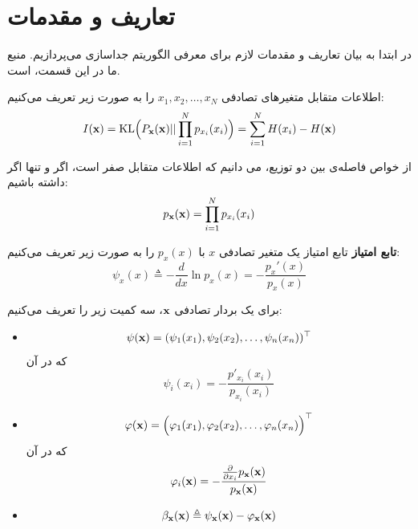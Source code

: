\documentclass[oneside]{thesis}
\begin{document}
\section{تعاریف و مقدمات}

در ابتدا به بیان تعاریف و مقدمات لازم برای معرفی الگوریتم جداسازی می‌پردازیم. منبع ما در این قسمت، 
\cite{mbzadehthesis}
است.
\begin{definition}
	اطلاعات متقابل متغیر‌های تصادفی
	$x_1, x_2, \dots, x_N$
	را به صورت زیر تعریف می‌کنیم:
	\begin{equation}
	I(\mathbf{x}) = \mathrm{KL}\Big(P_{\mathbf{x}}(\mathbf{x}) || \prod_{i = 1}^{N} p_{x_i}(x_i)\Big) = \sum_{i = 1}^{N} H(x_i) - H(\mathbf{x})
	\end{equation}
\end{definition}

از خواص فاصله‌ی 
بین دو توزیع، می دانیم که اطلاعات متقابل صفر است، اگر و تنها اگر داشته باشیم:
\begin{equation}
p_{\mathbf{x}}(\mathbf{x}) = \prod_{i = 1}^{N} p_{x_i}(x_i)
\end{equation}

\begin{definition}
	\textbf{تابع امتیاز}
	تابع امتیاز یک متغیر تصادفی 
	$x$
	با 
	$p_x(x)$
	را به صورت زیر تعریف می‌کنیم:
	\begin{equation}
	\psi_x(x) \triangleq -\frac{d}{dx} \ln p_x(x) = -\frac{p_x'(x)}{p_x(x)}
	\end{equation}
\end{definition}


\begin{definition}
	برای یک بردار تصادفی 
	$\mathbf{x}$، 
	سه کمیت زیر را تعریف می‌کنیم:
\end{definition}
	\begin{itemize}
		\item
		\textbf{}
		\begin{equation}
		\mathbf{\psi}(\mathbf{x}) = (\psi_1(x_1), \psi_2(x_2),\dots, \psi_n(x_n))^\top
		\end{equation}
		که در آن
		\begin{equation}
		\psi_i(x_i) = - \frac{p'_{x_i}(x_i)}{p_{x_i}(x_i)}
		\end{equation}
		\item 
		\textbf{}
		\begin{equation}
		\mathbf{\varphi}(\mathbf{x}) = \Big(\varphi_1(x_1), \varphi_2(x_2),\dots, \varphi_n(x_n)\Big)^\top
		\end{equation}
		که در آن
		\begin{equation}
		\varphi_i(\mathbf{x}) = -\frac{\frac{\partial}{\partial x_i}p_{\mathbf{x}}(\mathbf{x})}{p_{\mathbf{x}}(\mathbf{x})}
		\end{equation}
		
		\item
		\textbf{ }	
		\begin{equation}
		\mathbf{\beta}_{\mathbf{x}} (\mathbf{x}) \triangleq \mathbf{\psi}_{\mathbf{x}}(\mathbf{x}) - \varphi_{\mathbf{x}}(\mathbf{x})
		\end{equation}
		
	\end{itemize}
\end{document}
